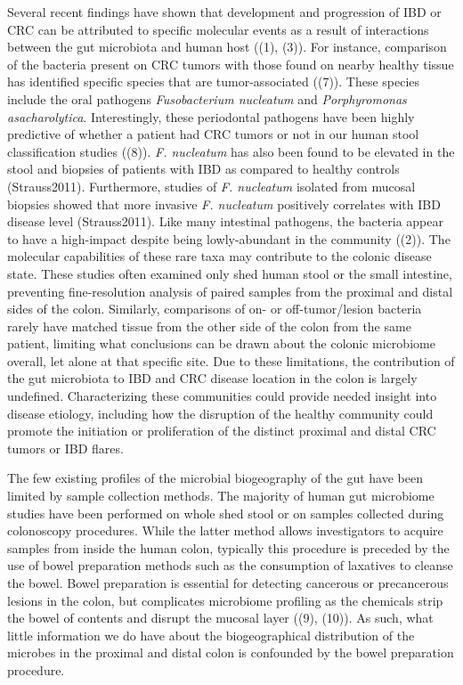 \documentclass[11pt,]{article}
\begin{document}
Several recent findings have shown that development and progression of
IBD or CRC can be attributed to specific molecular events as a result of
interactions between the gut microbiota and human host ((1), (3)). For
instance, comparison of the bacteria present on CRC tumors with those
found on nearby healthy tissue has identified specific species that are
tumor-associated ((7)). These species include the oral pathogens
\emph{Fusobacterium nucleatum} and \emph{Porphyromonas asacharolytica}.
Interestingly, these periodontal pathogens have been highly predictive
of whether a patient had CRC tumors or not in our human stool
classification studies ((8)). \emph{F. nucleatum} has also been found to
be elevated in the stool and biopsies of patients with IBD as compared
to healthy controls (Strauss2011). Furthermore, studies of \emph{F.
nucleatum} isolated from mucosal biopsies showed that more invasive
\emph{F. nucleatum} positively correlates with IBD disease level
(Strauss2011). Like many intestinal pathogens, the bacteria appear to
have a high-impact despite being lowly-abundant in the community ((2)).
The molecular capabilities of these rare taxa may contribute to the
colonic disease state. These studies often examined only shed human
stool or the small intestine, preventing fine-resolution analysis of
paired samples from the proximal and distal sides of the colon.
Similarly, comparisons of on- or off-tumor/lesion bacteria rarely have
matched tissue from the other side of the colon from the same patient,
limiting what conclusions can be drawn about the colonic microbiome
overall, let alone at that specific site. Due to these limitations, the
contribution of the gut microbiota to IBD and CRC disease location in
the colon is largely undefined. Characterizing these communities could
provide needed insight into disease etiology, including how the
disruption of the healthy community could promote the initiation or
proliferation of the distinct proximal and distal CRC tumors or IBD
flares.

The few existing profiles of the microbial biogeography of the gut have
been limited by sample collection methods. The majority of human gut
microbiome studies have been performed on whole shed stool or on samples
collected during colonoscopy procedures. While the latter method allows
investigators to acquire samples from inside the human colon, typically
this procedure is preceded by the use of bowel preparation methods such
as the consumption of laxatives to cleanse the bowel. Bowel preparation
is essential for detecting cancerous or precancerous lesions in the
colon, but complicates microbiome profiling as the chemicals strip the
bowel of contents and disrupt the mucosal layer ((9), (10)). As such,
what little information we do have about the biogeographical
distribution of the microbes in the proximal and distal colon is
confounded by the bowel preparation procedure.
\end{document}
